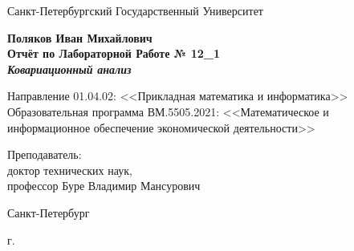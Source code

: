 \begin{titlepage}
	\begin{center}		
		Санкт-Петербургский Государственный Университет

		\vspace{35mm}
		
		\textbf{\large Поляков Иван Михайлович} \\[8mm]
		
		\textbf{\large Отчёт по Лабораторной Работе № 12\_1}\\[3mm]
		\textbf{\textit{\large Ковариационный анализ}}
		
		\vspace{20mm}
		
		Направление 01.04.02: <<Прикладная математика и информатика>>\\ 
		Образовательная программа ВМ.5505.2021: <<Математическое и информационное обеспечение экономической деятельности>> \\ [30mm]
		
		
		\begin{flushright}
			{Преподаватель:} \\
			доктор технических наук, \\ профессор Буре Владимир Мансурович
		\end{flushright}
		
		\vfill
		
		{Санкт-Петербург}
		\par{\the\year{} г.}
	\end{center}
\end{titlepage}
\restoregeometry
\addtocounter{page}{1}

